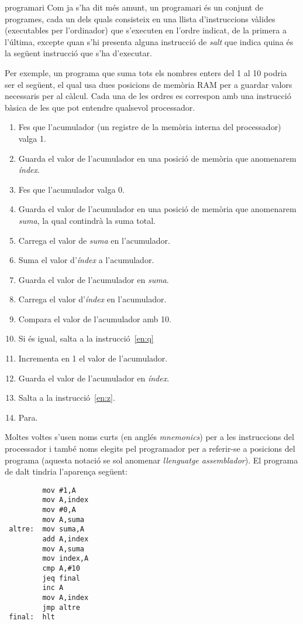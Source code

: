 \begin{persabermes}{programari}
Com ja s'ha dit més amunt, un programari és un conjunt de programes,
cada un dels quals consisteix en una llista d'instruccions vàlides
(executables per l'ordinador) que s'executen en l'ordre indicat, de
la primera a l'última, excepte quan s'hi presenta alguna instrucció
de \emph{salt} que indica quina és la següent instrucció que s'ha
d'executar.

Per exemple, un programa que suma tots els nombres enters del 1 al 10
podria ser el següent, el qual usa dues posicions de memòria RAM per a
guardar valors necessaris per al càlcul. Cada una de les ordres es
correspon amb una instrucció bàsica de les que pot entendre qualsevol
processador.
\begin{enumerate}
\item Fes que l'acumulador (un registre de la memòria interna del
  processador) valga 1.
\item Guarda el valor de l'acumulador en una posició de memòria que
  anomenarem \emph{índex}.
\item Fes que l'acumulador valga 0.
\item Guarda el valor de l'acumulador en una posició de memòria que
  anomenarem \emph{suma}, la qual contindrà la suma total.
\item \label{en:z} Carrega el valor de \emph{suma} en l'acumulador.
\item Suma el valor d'\emph{índex} a l'acumulador.
\item Guarda el valor de l'acumulador en \emph{suma}.
\item Carrega el valor d'\emph{índex} en l'acumulador.
\item Compara el valor de l'acumulador amb 10.
\item Si és igual, salta a la instrucció~\ref{en:q}
\item Incrementa en 1 el valor de l'acumulador.
\item Guarda el valor de l'acumulador en \emph{índex}.
\item Salta a la instrucció~\ref{en:z}.
\item \label{en:q} Para.
\end{enumerate}

Moltes voltes s'usen noms curts (en anglés \emph{mnemonics}) per a les
instruccions del processador i també noms elegits pel programador per
a referir-se a posicions del programa (aquesta notació se sol anomenar
\emph{llenguatge assemblador}). El programa de dalt tindria l'aparença
següent:
\begin{verbatim}
         mov #1,A
         mov A,index
         mov #0,A
         mov A,suma
 altre:  mov suma,A
         add A,index
         mov A,suma
         mov index,A
         cmp A,#10
         jeq final
         inc A
         mov A,index
         jmp altre
 final:  hlt
\end{verbatim}


\end{persabermes}
